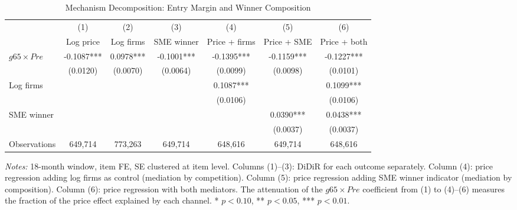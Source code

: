 \begin{table}[htbp]
\centering
\caption{Mechanism Decomposition: Entry Margin and Winner Composition}
\label{tab:entry_margin}
\begin{adjustbox}{max width=\textwidth}
\begin{threeparttable}
\small
\begin{tabular}{lcccccc}
\toprule
 & (1) & (2) & (3) & (4) & (5) & (6) \\
 & Log price & Log firms & SME winner & Price + firms & Price + SME & Price + both \\
\midrule
$g65 \times Pre$ & -0.1087*** & 0.0978*** & -0.1001*** & -0.1395*** & -0.1159*** & -0.1227*** \\
 & (0.0120) & (0.0070) & (0.0064) & (0.0099) & (0.0098) & (0.0101) \\
\midrule
Log firms &  &  &  & 0.1087*** &  & 0.1099*** \\
 &  &  &  & (0.0106) &  & (0.0106) \\
SME winner &  &  &  &  & 0.0390*** & 0.0438*** \\
 &  &  &  &  & (0.0037) & (0.0037) \\
\midrule
Observations & 649,714 & 773,263 & 649,714 & 648,616 & 649,714 & 648,616 \\
\bottomrule
\end{tabular}
\begin{tablenotes}
\small
\item \textit{Notes:} 18-month window, item FE, SE clustered at item level. 
Columns (1)--(3): DiDiR for each outcome separately. 
Column (4): price regression adding log firms as control (mediation by competition). 
Column (5): price regression adding SME winner indicator (mediation by composition). 
Column (6): price regression with both mediators. 
The attenuation of the $g65 \times Pre$ coefficient from (1) to (4)--(6) measures 
the fraction of the price effect explained by each channel. 
* $p<0.10$, ** $p<0.05$, *** $p<0.01$.
\end{tablenotes}
\end{threeparttable}
\end{adjustbox}
\end{table}
